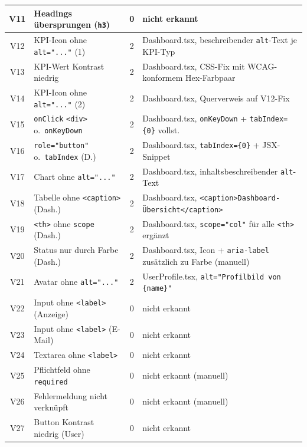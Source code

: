 \begin{longtable}{|c|p{5.0cm}|c|p{5.4cm}|}
V11  & Headings übersprungen (\texttt{h3})          & 0 & nicht erkannt \\ \hline
V12  & \ac{KPI}-Icon ohne \texttt{alt="..."} (1)               & 2 & Dashboard.tsx, beschreibender \texttt{alt}-Text je \ac{KPI}-Typ \\ \hline
V13  & \ac{KPI}-Wert Kontrast niedrig                    & 2 & Dashboard.tsx, \ac{CSS}-Fix mit \ac{WCAG}-konformem Hex-Farbpaar \\ \hline
V14  & \ac{KPI}-Icon ohne \texttt{alt="..."} (2)               & 2 & Dashboard.tsx, Querverweis auf V12-Fix \\ \hline
V15  & \texttt{onClick} \texttt{<div>} o.\ \texttt{onKeyDown} & 2 & Dashboard.tsx, \texttt{onKeyDown} + \texttt{tabIndex=\{0\}} vollst. \\ \hline
V16  & \texttt{role="button"} o.\ \texttt{tabIndex} (D.) & 2 & Dashboard.tsx, \texttt{tabIndex=\{0\}} + \ac{JSX}-Snippet \\ \hline
V17  & Chart ohne \texttt{alt="..."}                      & 2 & Dashboard.tsx, inhaltsbeschreibender \texttt{alt}-Text \\ \hline
V18  & Tabelle ohne \texttt{<caption>} (Dash.)      & 2 & Dashboard.tsx, \texttt{<caption>Dash\-board-Über\-sicht</caption>} \\ \hline
V19  & \texttt{<th>} ohne \texttt{scope} (Dash.)    & 2 & Dashboard.tsx, \texttt{scope="col"} für alle \texttt{<th>} ergänzt \\ \hline
V20  & Status nur durch Farbe (Dash.)               & 2 & Dashboard.tsx, Icon + \texttt{aria-label} zusätzlich zu Farbe (manuell) \\ \hline
V21  & Avatar ohne \texttt{alt="..."}                     & 2 & UserProfile.tsx, \texttt{alt="Profilbild von \{name\}"} \\ \hline
V22  & Input ohne \texttt{<label>} (Anzeige)        & 0 & nicht erkannt \\ \hline
V23  & Input ohne \texttt{<label>} (E-Mail)         & 0 & nicht erkannt \\ \hline
V24  & Textarea ohne \texttt{<label>}               & 0 & nicht erkannt \\ \hline
V25  & Pflichtfeld ohne \texttt{required}           & 0 & nicht erkannt (manuell) \\ \hline
V26  & Fehlermeldung nicht verknüpft                & 0 & nicht erkannt (manuell) \\ \hline
V27  & Button Kontrast niedrig (User)               & 0 & nicht erkannt \\ \hline

\end{longtable}
